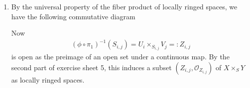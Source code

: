 \newcommand{\sheet}{6}




\maketitle{}

\begin{exercise}{1}
    \begin{enumerate}
        \item By the universal property of the fiber product of locally ringed spaces,
        we have the following commutative diagram
        \begin{center}
        \end{center}

    Now 
    \begin{align*}
        (\phi \circ \pi_1)^{-1}(S_{i,j})=U_i \times_{S_{i,j}} V_j  =: Z_{i,j}
    \end{align*}
    is open as the preimage of an open set under a continuous map. By the second
    part of exercise sheet 5, this induces a subset
    $(Z_{i,j},\mathcal{O}_{Z_{i,j}})$ of $X \times_S Y$ as locally
    ringed spaces.
    \end{enumerate}
\end{exercise}

